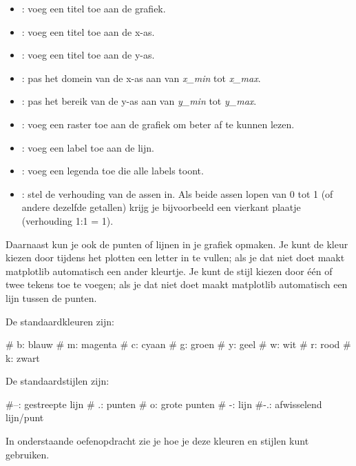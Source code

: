 \documentclass[a4paper,11pt, fleqn]{article}
\begin{document}
\begin{itemize}
	\setlength\itemsep{0em}
	\item {}: voeg een titel toe aan de grafiek.
	\item {}: voeg een titel toe aan de x-as.
	\item {}: voeg een titel toe aan de y-as.
	\item {}: pas het domein van de x-as aan van {\it x\_min} tot {\it x\_max}.
	\item {}: pas het bereik van de y-as aan van {\it y\_min} tot {\it y\_max}.
	\item {}: voeg een raster toe aan de grafiek om beter af te kunnen lezen.
	\item {}: voeg een label toe aan de lijn.
	\item {}: voeg een legenda toe die alle labels toont.
	\item {}: stel de verhouding van de assen in. Als beide assen lopen van 0 tot 1 (of andere dezelfde getallen) krijg je bijvoorbeeld een vierkant plaatje (verhouding 1:1 = 1).
\end{itemize}

Daarnaast kun je ook de punten of lijnen in je grafiek opmaken. Je kunt de kleur kiezen door tijdens het plotten een letter in te vullen; als je dat niet doet maakt matplotlib automatisch een ander kleurtje. Je kunt de stijl kiezen door \'e\'en of twee tekens toe te voegen; als je dat niet doet maakt matplotlib automatisch een lijn tussen de punten.

De standaardkleuren zijn:
\begin{python}
# b: blauw         # m: magenta      # c: cyaan
# g: groen         # y: geel         # w: wit
# r: rood          # k: zwart
\end{python}

De standaardstijlen zijn:
\begin{python}
#--: gestreepte lijn                 # .: punten
# o:  grote punten                   # -:  lijn
#-.: afwisselend lijn/punt
\end{python}

In onderstaande oefenopdracht zie je hoe je deze kleuren en stijlen kunt gebruiken.
\end{document}
